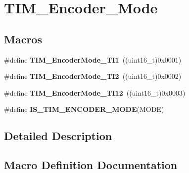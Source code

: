 \hypertarget{group___t_i_m___encoder___mode}{}\section{T\+I\+M\+\_\+\+Encoder\+\_\+\+Mode}
\label{group___t_i_m___encoder___mode}
\subsection*{Macros}
\begin{DoxyCompactItemize}
\item 
\hypertarget{group___t_i_m___encoder___mode_gabc63e3617a938382f87439ec58768b8e}{}\#define {\bfseries T\+I\+M\+\_\+\+Encoder\+Mode\+\_\+\+T\+I1}~((uint16\+\_\+t)0x0001)\label{group___t_i_m___encoder___mode_gabc63e3617a938382f87439ec58768b8e}

\item 
\hypertarget{group___t_i_m___encoder___mode_ga5627a2d5d47b7301c7dbb29d20ae00e3}{}\#define {\bfseries T\+I\+M\+\_\+\+Encoder\+Mode\+\_\+\+T\+I2}~((uint16\+\_\+t)0x0002)\label{group___t_i_m___encoder___mode_ga5627a2d5d47b7301c7dbb29d20ae00e3}

\item 
\hypertarget{group___t_i_m___encoder___mode_ga12511f903de08f1a634ff7828757f081}{}\#define {\bfseries T\+I\+M\+\_\+\+Encoder\+Mode\+\_\+\+T\+I12}~((uint16\+\_\+t)0x0003)\label{group___t_i_m___encoder___mode_ga12511f903de08f1a634ff7828757f081}

\item 
\#define {\bfseries I\+S\+\_\+\+T\+I\+M\+\_\+\+E\+N\+C\+O\+D\+E\+R\+\_\+\+M\+O\+D\+E}(M\+O\+D\+E)
\end{DoxyCompactItemize}


\subsection{Detailed Description}


\subsection{Macro Definition Documentation}
\hypertarget{group___t_i_m___encoder___mode_ga9dd5baa6b2a44e0f25068a650cbfdd1b}{}
